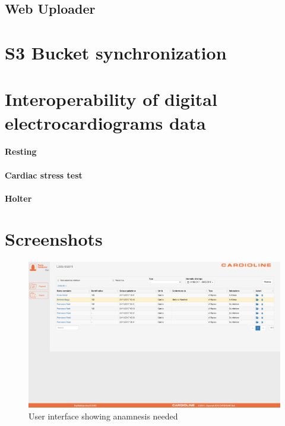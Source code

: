\subsection{Web Uploader}
\section{S3 Bucket synchronization}
\section{Interoperability of digital electrocardiograms data}
\paragraph{Resting}
\label{paragraph:Resting}
\paragraph{Cardiac stress test}
\label{paragraph:Cardiac stress test}
\paragraph{Holter}
\label{paragraph:Holter}

\section{Screenshots}
\begin{figure}[h]
    \includegraphics[width=\textwidth]{img/todo_anamnesi}
    \caption{User interface showing anamnesis needed}
    \label{fig:todo_anamnesi}
\end{figure}

